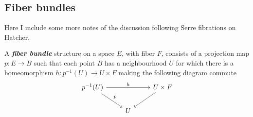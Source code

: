\subsection{Fiber bundles}

Here I include some more notes of the discussion following Serre fibrations on Hatcher.

	A \textbf{\textit{fiber bundle}} structure on a space $E$, with fiber $F$, consists of a projection map $p:E\to B$ such that each point $B$ has a neighbourhood $U$ for which there is a homeomorphism $h:p^{-1}(U)\to U\times F$ making the following diagram commute
	\[\begin{tikzcd}
		p^{-1}(U)\arrow[rr,"h"]\arrow[dr,"p"]&&U\times F\arrow[dl]\\
		&U
	\end{tikzcd}\]

